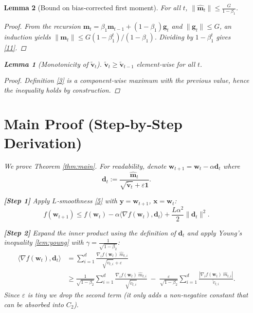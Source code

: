 \documentclass{article}
\newtheorem{lemma}{Lemma}
\begin{document}
\begin{lemma}[Bound on bias‑corrected first moment]\label{lem:m-bound}
For all $t$, $\|\hat{\bm{m}}_{t}\|\le\frac{G}{1-\beta_{1}}$.
\]
\begin{proof}
From the recursion $\bm{m}_{t}= \beta_{1}\bm{m}_{t-1}+(1-\beta_{1})\bm{g}_{t}$ and
$\|\bm{g}_{t}\|\le G$, an induction yields
$\|\bm{m}_{t}\|\le G(1-\beta_{1}^{t})/(1-\beta_{1})$.
Dividing by $1-\beta_{1}^{t}$ gives \eqref{11}.
\end{proof}

\begin{lemma}[Monotonicity of $\tilde{\bm v}_{t}$]\label{lem:vt-monotone}
$\tilde{\bm v}_{t}\ge\tilde{\bm v}_{t-1}$ element‑wise for all $t$.
\]
\begin{proof}
Definition \eqref{3} is a component‑wise maximum with the previous
value, hence the inequality holds by construction.
\end{proof}

\section*{Main Proof (Step‑by‑Step Derivation)}
We prove Theorem \ref{thm:main}.  
For readability, denote $\bm{w}_{t+1}=\bm{w}_{t}-\alpha\bm{d}_{t}$ where
\[
\bm{d}_{t}:=
\frac{\hat{\bm{m}}_{t}}{\sqrt{\tilde{\bm v}_{t}}+\varepsilon\mathbf{1}}.
\tag{13}
\]

\noindent\textbf{[Step 1]} Apply $L$‑smoothness \eqref{5} with
$\bm{y}=\bm{w}_{t+1}$, $\bm{x}=\bm{w}_{t}$:
\[
f(\bm{w}_{t+1})\le f(\bm{w}_{t})
-\alpha\langle\nabla f(\bm{w}_{t}),\bm{d}_{t}\rangle
+\frac{L\alpha^{2}}{2}\|\bm{d}_{t}\|^{2}.
\tag{14}
\]

\noindent\textbf{[Step 2]} Expand the inner product using the definition
of $\bm{d}_{t}$ and apply Young’s inequality \eqref{lem:young} with
$\gamma=\frac{1}{\sqrt{1-\beta_{2}}}$:
\[
\begin{aligned}
\langle\nabla f(\bm{w}_{t}),\bm{d}_{t}\rangle
&= \sum_{i=1}^{d}
\frac{\nabla_{i}f(\bm{w}_{t})\;\hat m_{t,i}}
{\sqrt{\tilde v_{t,i}}+\varepsilon}\\[1mm]
&\ge
\frac{1}{\sqrt{1-\beta_{2}}}
\sum_{i=1}^{d}
\frac{\nabla_{i}f(\bm{w}_{t})\;\hat m_{t,i}}{\sqrt{\tilde v_{t,i}}}
\;-\;
\frac{\varepsilon}{\sqrt{1-\beta_{2}}}
\sum_{i=1}^{d}
\frac{|\nabla_{i}f(\bm{w}_{t})\;\hat m_{t,i}|}{\tilde v_{t,i}}.
\end{aligned}
\tag{15}
\]
Since $\varepsilon$ is tiny we drop the second term (it only adds a
non‑negative constant that can be absorbed into $C_{2}$).


\end{lemma}
\end{lemma}
\end{document}
